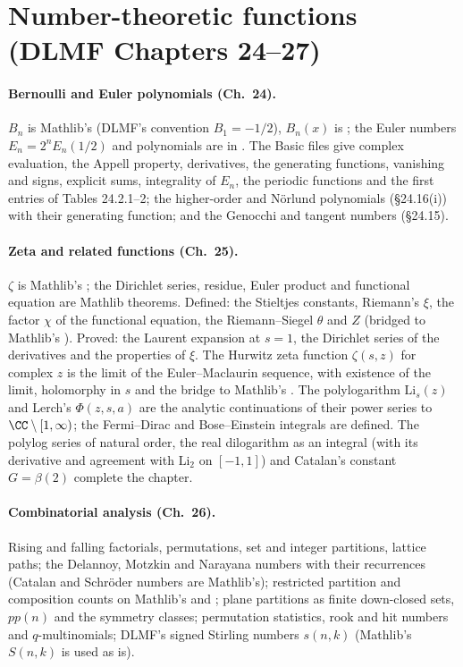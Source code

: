 \documentclass[11pt,a4paper]{article}
\begin{document}
\section{Number-theoretic functions (DLMF Chapters 24--27)}

\paragraph{Bernoulli and Euler polynomials (Ch.~24).} $B_n$ is Mathlib's  (DLMF's
convention $B_1=-1/2$), $B_n(x)$ is ; the Euler numbers $E_n=2^nE_n(1/2)$
and polynomials are in . The Basic files give complex evaluation, the Appell
property, derivatives, the generating functions, vanishing and signs, explicit sums, integrality of
$E_n$, the periodic functions and the first entries of Tables 24.2.1--2; the higher-order and
N\"orlund polynomials (\S24.16(i)) with their generating function; and the Genocchi and tangent
numbers (\S24.15).

\paragraph{Zeta and related functions (Ch.~25).} $\zeta$ is Mathlib's ; the
Dirichlet series, residue, Euler product and functional equation are Mathlib theorems. Defined:
the Stieltjes constants, Riemann's $\xi$, the factor $\chi$ of the functional equation, the
Riemann--Siegel $\theta$ and $Z$ (bridged to Mathlib's ). Proved: the Laurent expansion
at $s=1$, the Dirichlet series of the derivatives and the properties of $\xi$. The Hurwitz zeta
function $\zeta(s,z)$ for complex $z$ is the limit of the Euler--Maclaurin sequence, with existence
of the limit, holomorphy in $s$ and the bridge to Mathlib's . The polylogarithm
$\mathrm{Li}_s(z)$ and Lerch's $\Phi(z,s,a)$ are the analytic continuations of their power series to
$\CC\setminus[1,\infty)$; the Fermi--Dirac and Bose--Einstein integrals are defined. The polylog
series of natural order, the real dilogarithm as an integral (with its derivative and agreement with
$\mathrm{Li}_2$ on $[-1,1]$) and Catalan's constant $G=\beta(2)$ complete the chapter.

\paragraph{Combinatorial analysis (Ch.~26).} Rising and falling factorials, permutations, set and
integer partitions, lattice paths; the Delannoy, Motzkin and Narayana numbers with their
recurrences (Catalan and Schr\"oder numbers are Mathlib's); restricted partition and composition
counts on Mathlib's  and ; plane partitions as finite
down-closed sets, $pp(n)$ and the symmetry classes; permutation statistics, rook and hit numbers
and $q$-multinomials; DLMF's signed Stirling numbers $s(n,k)$ (Mathlib's $S(n,k)$ is used as is).
\end{document}
